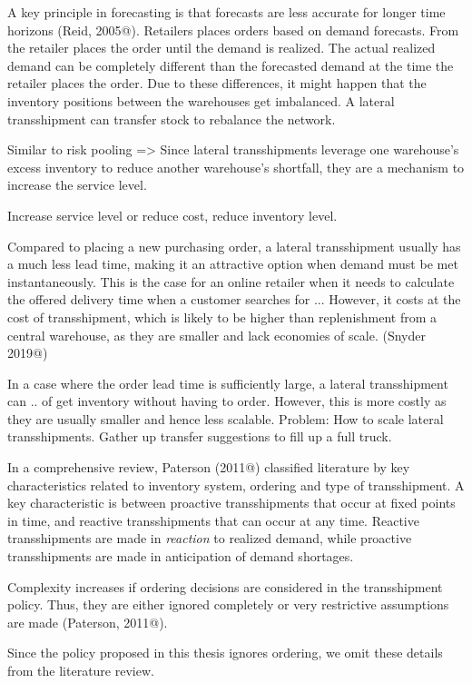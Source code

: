 \documentclass[../../main.tex]{subfiles}
\begin{document}
A key principle in forecasting is that forecasts are less accurate for longer time horizons (Reid, 2005@). Retailers places orders based on demand forecasts. From the retailer places the order until the demand is realized. The actual realized demand can be completely different than the forecasted demand at the time the retailer places the order. Due to these differences, it might happen that the inventory positions between the warehouses get imbalanced. A lateral transshipment can transfer stock to rebalance the network. 

Similar to risk pooling => Since lateral transshipments leverage one warehouse's excess inventory to reduce another warehouse's shortfall, they are a mechanism to increase the service level.

Increase service level or reduce cost, reduce inventory level.

Compared to placing a new purchasing order, a lateral transshipment usually has a much less lead time, making it an attractive option when demand must be met instantaneously. This is the case for an online retailer when it needs to calculate the offered delivery time when a customer searches for ... However, it costs at the cost of transshipment, which is likely to be higher than replenishment from a central warehouse, as they are smaller and lack economies of scale. (Snyder 2019@)

In a case where the order lead time is sufficiently large, a lateral transshipment can .. of get inventory without having to order. However, this is more costly as they are usually smaller and hence less scalable. Problem: How to scale lateral transshipments. Gather up transfer suggestions to fill up a full truck.

In a comprehensive review, Paterson (2011@) classified literature by key characteristics related to inventory system, ordering and type of transshipment. A key characteristic is between proactive transshipments that occur at fixed points in time, and reactive transshipments that can occur at any time. Reactive transshipments are made in \textit{reaction} to realized demand, while proactive transshipments are made in anticipation of demand shortages. 

Complexity increases if ordering decisions are considered in the transshipment policy. Thus, they are either ignored completely or very restrictive assumptions are made (Paterson, 2011@). 

Since the policy proposed in this thesis ignores ordering, we omit these details from the literature review.
\end{document}
